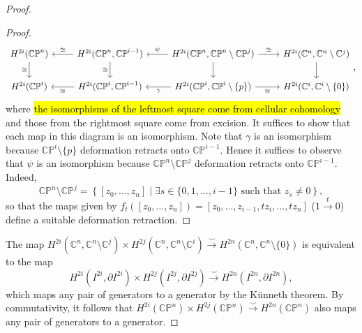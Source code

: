 \documentclass[10pt,letterpaper,cm]{nupset}
\theoremstyle{definition}
\theoremstyle{theorem}
\theoremstyle{remark}
\newcommand{\C}{\mathbb C}
\newcommand{\CP}{\mathbb{CP}}
\newcommand{\1}{\mathbb{1}}
\newcommand{\0}{\vec 0}
\begin{document}
\begin{proof}
\begin{proof}
\[\begin{tikzcd}
H^{2i}(\CP^n) \arrow[d, "\cong"'] & {H^{2i}(\CP^n, \CP^{i-1})} \arrow[l, "\cong"'] \arrow[d, "\cong"'] & {H^{2i}(\CP^n, \CP^n \setminus \CP^j)} \arrow[l, "\psi"'] \arrow[r, "\cong"] \arrow[d] & {H^{2i}(\C^n, \C^n \setminus \C^j)} \arrow[d] \\
H^{2i}(\CP^i)                     & {H^{2i}(\CP^i, \CP^{i-1})} \arrow[l, "\cong"]                      & {H^{2i}(\CP^i, \CP^i \setminus \{p\})} \arrow[l, "\gamma"] \arrow[r, "\cong"']                             & {H^{2i}(\C^i, \C^i \setminus \{0\})}           
\end{tikzcd}
,\] where \hl{the isomorphisms of the leftmost square come from cellular cohomology} and those from the rightmost square come from excision. It suffices to show that each map in this diagram is an isomorphism. Note that $\gamma$ is an isomorphism because $\CP^i \setminus \{p\}$ deformation retracts onto $\CP^{i-1}$. Hence it suffices to observe that $\psi$ is an isomorphism because $\CP^n \setminus \CP^{j}$ deformation retracts onto $\CP^{i-1}$. Indeed, $$\CP^n \setminus \CP^{j}= \left\{[z_0, \ldots, z_n] \mid \exists s \in \{0,1, \ldots, i-1\} \text{ such that } z_s \ne 0\right\},$$ so that the maps given by $f_t([z_0, \ldots, z_n])  = [z_0, \ldots, z_{i-1}, tz_i, \ldots, tz_n]$ ($1 \overset{t}{\rightarrow} 0$) define a suitable deformation retraction. 
\end{proof}
The map $H^{2i}(\C^n, \C^n \setminus \C^j)\times H^{2j}(\C^n, \C^n \setminus \C^i) \overset{\smile}{\longrightarrow} H^{2n}(\C^n, \C^n \setminus \{0\})$ is equivalent to the map $$H^{2i}(I^{2i}, \partial{I^{2i}})\times H^{2j}(I^{2j}, \partial{I^{2j}}) \overset{\smile}{\longrightarrow} H^{2n}(I^{2n}, \partial{I^{2n}}),$$ which maps any pair of generators to a generator by the K\"unneth theorem. 
By commutativity, it follows that $ H^{2i}(\CP^n)\times H^{2j}(\CP^n) \overset{\smile}{\longrightarrow} H^{2n}(\CP^n) $ also maps any pair of generators to a generator.  
\end{proof}
\end{document}
